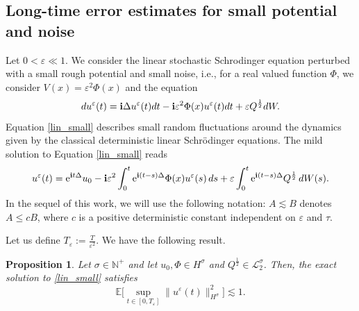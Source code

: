 \documentclass[a4paper]{amsart}
\newtheorem{proposition}[theorem]{Proposition}
\begin{document}
\subsection{Long-time error estimates for small potential and noise}
Let $0<\varepsilon\ll1$. We consider the linear stochastic Schrodinger equation perturbed with a small rough  potential  and small noise, i.e., for a real valued function $\Phi$, we consider $V(x)=\varepsilon^2 \Phi(x)$ and the equation
\begin{equation}
    \label{lin_small}
d u^\varepsilon(t)={\bf i}\Delta u^\varepsilon(t) dt-{\bf i}\varepsilon^2 \Phi(x) u^\varepsilon(t)dt+\varepsilon Q^{\frac{1}{2}} dW.
\end{equation}
Equation \eqref{lin_small} describes small random fluctuations around the dynamics given by the classical deterministic linear Schrödinger equations.
The mild solution to Equation \eqref{lin_small} reads
$$
u^\varepsilon(t)={\rm e}^{{\bf i}t \Delta}u_0-{\bf i}\varepsilon^2 \int_0^t {\rm e}^{{\bf i}(t-s)\Delta}\Phi(x)u^\varepsilon(s)\,ds+\varepsilon\int_0^t {\rm e}^{{\bf i}(t-s)\Delta}Q^{\frac{1}{2}}\,dW(s).
$$
In the sequel of this work, we will use the following notation: $A\lesssim B$ denotes $A\le c B$, where $c$ is a positive deterministic constant independent on $\varepsilon$  and $\tau$.

Let us define $T_\varepsilon:=\frac{T}{\varepsilon^2}.$
We have the following result. 
\begin{proposition}
\label{smal_prop}
    Let $\sigma\in\mathbb{N}^+$ and let $u_0, \Phi \in H^\sigma$ and $Q^{\frac{1}{2}}\in\mathcal{L}_2^\sigma$. Then, the exact solution to \eqref{lin_small} satisfies
    $$
   \mathbb{E}\big[\sup_{t\in[0,T_\varepsilon]} \|u^\varepsilon(t)\|_{H^\sigma}^2\big]\lesssim 1.
    $$
    \end{proposition}
\end{document}
